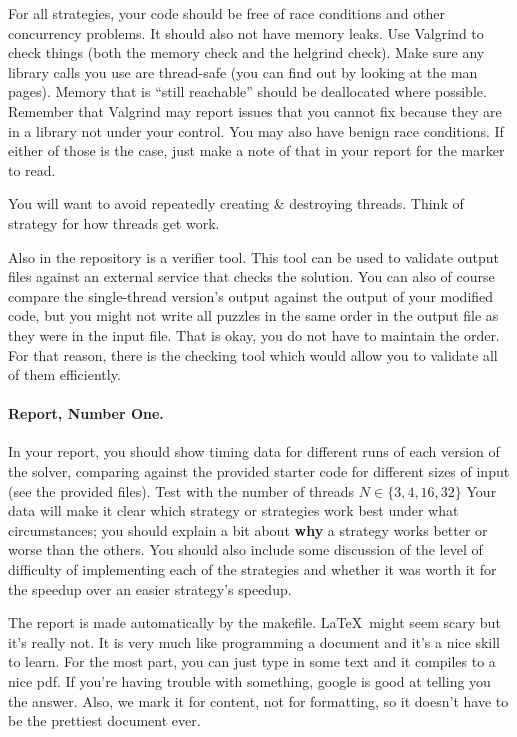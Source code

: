 \documentclass[letterpaper,10pt]{article}
\begin{document}
For all strategies, your code should be free of race conditions and other
concurrency problems. It should also not have memory leaks. Use Valgrind
to check things (both the memory check and the helgrind check). 
Make sure any library calls you use are thread-safe (you
can find out by looking at the man pages). Memory that is ``still reachable'' 
should be deallocated where possible. Remember that Valgrind may report
issues that you cannot fix because they are in a library not under your
control. You may also have benign race conditions. If either of those 
is the case, just make a note of that in your report for the marker to read.

You will want to avoid repeatedly creating \& destroying threads.
Think of strategy for how threads get work.

Also in the repository is a verifier tool. This tool can be used to validate
output files against an external service that checks the solution. You can
also of course compare the single-thread version's output against the output
of your modified code, but you might not write all puzzles in the same order
in the output file as they were in the input file. That is okay, you do not
have to maintain the order. For that reason, there is the checking tool
which would allow you to validate all of them efficiently.

\paragraph{Report, Number One.} In your report, you should show timing data 
for different runs of each version of the solver, comparing against the
provided starter code for different sizes of input (see the provided files).
Test with the number of threads $N \in \{3, 4, 16, 32\}$
Your data will make it clear which strategy or strategies work best under
what circumstances; you should explain a bit about \textbf{why} 
a strategy works
better or worse than the others. You should also include some discussion
of the level of difficulty of implementing each of the strategies and whether
it was worth it for the speedup over an easier strategy's speedup.

The report is made automatically by the makefile. \LaTeX~might seem scary
but it's really not. It is very much like programming a document and it's
a nice skill to learn. For the most part, you can just type in some text and
it compiles to a nice pdf. If you're having trouble with something, google
is good at telling you the answer. Also, we mark it for content, not for
formatting, so it doesn't have to be the prettiest document ever. 
\end{document}
